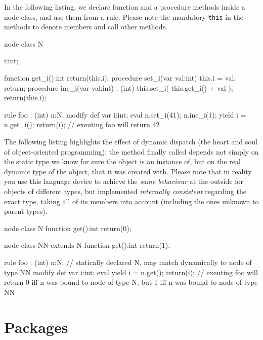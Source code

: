 \begin{example}
In the following listing, we declare function and a procedure methods inside a node class, and use them from a rule.
Please note the mandatory \texttt{this} in the methods to denote members and call other methods.
	\begin{grgen}
node class N
{
	i:int;
	
	function get_i():int
	{
		return(this.i);
	}
	procedure set_i(var val:int)
	{
		this.i = val;
		return;
	}
	procedure inc_i(var val:int) : (int)
	{
		this.set_i( this.get_i() + val );
		return(this.i);
	}
}

rule foo : (int)
{
	n:N;
	modify {
		def var i:int;
		eval {
			n.set_i(41);
			n.inc_i(1);
			yield i = n.get_i();
		}
		return(i); // exeuting foo will return 42
	}
}
	\end{grgen}
\end{example}


\begin{example}
The following listing highlights the effect of dynamic dispatch (the heart and soul of object-oriented programming): 
the method finally called depends not simply on the static type we know for sure the object is an instance of,
but on the real dynamic type of the object, that it was created with.
Please note that in reality you use this language device to achieve the \emph{same behaviour} at the outside for objects of different types, but implemented \emph{internally consistent} regarding the exact type, taking all of its members into account (including the ones unknown to parent types).
	\begin{grgen}
node class N
{	
	function get():int
	{
		return(0);
	}
}

node class NN extends N
{	
	function get():int
	{
		return(1);
	}
}

rule foo : (int)
{
	n:N; // statically declared N, may match dynamically to node of type NN
	modify {
		def var i:int;
		eval {
			yield i = n.get();
		}
		return(i); // exeuting foo will return 0 iff n was bound to node of type N, but 1 iff n was bound to node of type NN
	}
}
	\end{grgen}
\end{example}


\section{Packages}\label{sec:packages}

